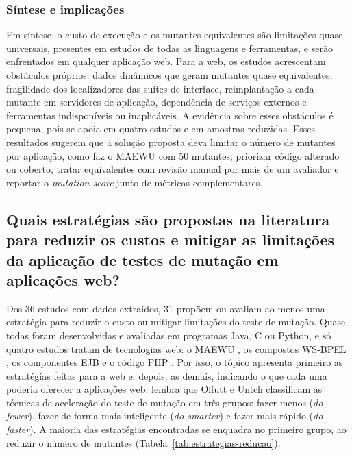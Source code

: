 \subsubsection{Síntese e implicações}
\label{subsubsec:sintese-implicacoes}

Em síntese, o custo de execução e os mutantes equivalentes são limitações quase universais, presentes em estudos de todas as linguagens e ferramentas, e serão enfrentados em qualquer aplicação web. Para a web, os estudos acrescentam obstáculos próprios: dados dinâmicos que geram mutantes quase equivalentes, fragilidade dos localizadores das suítes de interface, reimplantação a cada mutante em servidores de aplicação, dependência de serviços externos e ferramentas indisponíveis ou inaplicáveis. A evidência sobre esses obstáculos é pequena, pois se apoia em quatro estudos e em amostras reduzidas. Esses resultados sugerem que a solução proposta deva limitar o número de mutantes por aplicação, como faz o MAEWU com 50 mutantes, priorizar código alterado ou coberto, tratar equivalentes com revisão manual por mais de um avaliador e reportar o \textit{mutation score} junto de métricas complementares.

\subsection[Estratégias para reduzir os custos]{Quais estratégias são propostas na literatura para reduzir os custos e mitigar as limitações da aplicação de testes de mutação em aplicações web?}
\label{subsec:estrategias-reducao}

Dos 36 estudos com dados extraídos, 31 propõem ou avaliam ao menos uma estratégia para reduzir o custo ou mitigar limitações do teste de mutação. Quase todas foram desenvolvidas e avaliadas em programas Java, C ou Python, e só quatro estudos tratam de tecnologias web: o MAEWU \cite{yandrapally2021}, os compostos WS-BPEL \cite{esterobotaro2010}, os componentes EJB \cite{nica2011} e o código PHP \cite{belli2011}. Por isso, o tópico apresenta primeiro as estratégias feitas para a web e, depois, as demais, indicando o que cada uma poderia oferecer a aplicações web.  lembra que Offutt e Untch classificam as técnicas de aceleração do teste de mutação em três grupos: fazer menos (\textit{do fewer}), fazer de forma mais inteligente (\textit{do smarter}) e fazer mais rápido (\textit{do faster}). A maioria das estratégias encontradas se enquadra no primeiro grupo, ao reduzir o número de mutantes (Tabela~\ref{tab:estrategias-reducao}).

